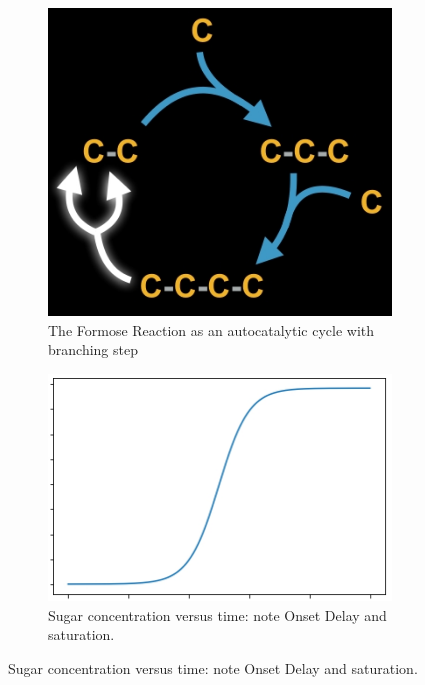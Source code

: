 \documentclass[]{article}
\begin{document}
\begin{figure}[H]
	\begin{subfigure}[b]{0.45\textwidth}
		\caption{The Formose Reaction as an autocatalytic cycle with branching step}\label{fig:Formose1}
		\includegraphics[width=\textwidth]{Formose1}
	\end{subfigure}
	\begin{subfigure}[b]{0.45\textwidth}
	\caption{Sugar concentration versus time: note Onset Delay and saturation.}\label{fig:Formose2}
	\includegraphics[width=\textwidth]{Formose2}
\end{subfigure}
\end{figure}
\end{document}
